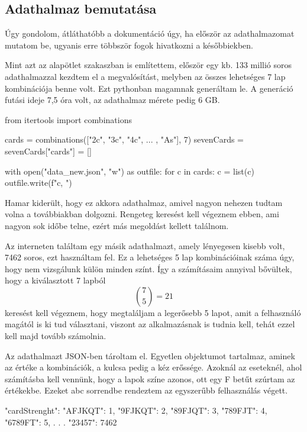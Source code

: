 \subsection{Adathalmaz bemutatása}
Úgy gondolom, átláthatóbb a dokumentáció úgy, ha először az adathalmazomat mutatom be, ugyanis erre többször fogok hivatkozni a későbbiekben. 

Mint azt az alapötlet szakaszban is említettem, először egy kb. 133 millió soros adathalmazzal kezdtem el a megvalósítást, melyben az összes lehetséges 7 lap kombinációja benne volt. Ezt pythonban magamnak generáltam le. A generáció futási ideje 7,5 óra volt, az adathalmaz mérete pedig 6 GB.

\begin{python}
from itertools import combinations

cards = combinations(["2c", "3c", "4c", ... , "As"], 7)
sevenCards = {}
sevenCards["cards"] = []

with open("data_new.json", "w") as outfile:
    for c in cards:
        c = list(c)
        outfile.write(f"{c}, \n")
\end{python}

Hamar kiderült, hogy ez akkora adathalmaz, amivel nagyon nehezen tudtam volna a továbbiakban dolgozni. Rengeteg keresést kell végeznem ebben, ami nagyon sok időbe telne, ezért más megoldást kellett találnom.

Az interneten találtam egy másik adathalmazt, amely lényegesen kisebb volt, 7462 soros, ezt használtam fel. 
\cite{chances}
Ez a lehetséges 5 lap kombinációinak száma úgy, hogy nem vizsgálunk külön minden színt. Így a számításaim annyival bővültek, hogy a kiválasztott 7 lapból \[ \binom{7}{5}=21\] keresést kell végeznem, hogy megtaláljam a legerősebb 5 lapot, amit a felhasználó magától is ki tud választani, viszont az alkalmazásnak is tudnia kell, tehát ezzel kell majd tovább számolnia.

Az adathalmazt JSON-ben tároltam el. Egyetlen objektumot tartalmaz, aminek az értéke a kombinációk, a kulcsa pedig a kéz erőssége. Azoknál az eseteknél, ahol számításba kell vennünk, hogy a lapok színe azonos, ott egy F betűt szúrtam az értékekbe. Ezeket abc sorrendbe rendeztem az egyszerűbb felhasználás végett.

\begin{python}
{
  "cardStrenght": {
    "AFJKQT": 1,
    "9FJKQT": 2,
    "89FJQT": 3,
    "789FJT": 4,
    "6789FT": 5,
    .
    .
    .
    "23457": 7462
    }
}
\end{python}

